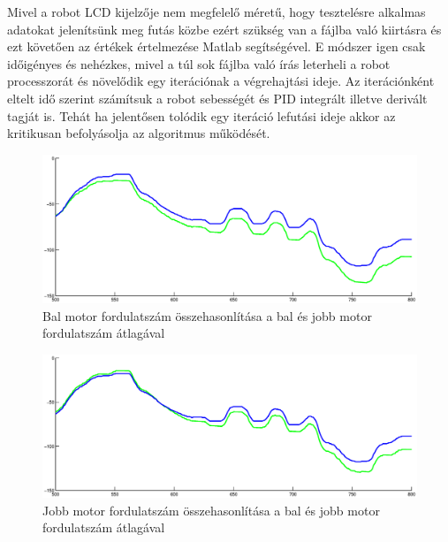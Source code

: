 Mivel a robot LCD kijelzője nem megfelelő méretű, hogy tesztelésre alkalmas adatokat jelenítsünk meg futás közbe ezért szükség van a fájlba való kiirtásra és ezt követően az értékek értelmezése Matlab segítségével. E módszer igen csak időigényes és nehézkes, mivel a túl sok fájlba való írás leterheli a robot processzorát és növelődik egy iterációnak a végrehajtási ideje. Az iterációnként eltelt idő szerint számítsuk a robot sebességét és PID integrált illetve derivált tagját is. Tehát ha jelentősen tolódik egy iteráció lefutási ideje akkor az kritikusan befolyásolja az algoritmus működését.

\begin{figure}[!ht]
	\begin{center}
		\includegraphics[width=1.0\linewidth]{images/balTacho.eps}
	\end{center}
	\caption{Bal motor fordulatszám összehasonlítása a bal és jobb motor fordulatszám átlagával}
	\label{balTachoFig}
\end{figure}

\begin{figure}[!ht]
	\begin{center}
		\includegraphics[width=1.0\linewidth]{images/jobbTacho.eps}
	\end{center}
	\caption{Jobb motor fordulatszám összehasonlítása a bal és jobb motor fordulatszám átlagával}
	\label{jobbTachoFig}
\end{figure}

